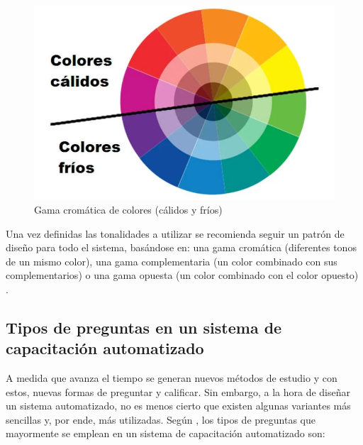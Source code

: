\begin{figure}[h]
\centering
 \includegraphics[width=0.6\linewidth]{imagen/gama.png}
 \caption{Gama cromática de colores (cálidos y fríos)}
 \label{fig:colores} 
\end{figure}

Una vez definidas las tonalidades a utilizar se recomienda seguir un patrón de diseño para todo el sistema, basándose en: una gama cromática (diferentes tonos de un mismo color), una gama complementaria (un color combinado con sus complementarios) o una gama opuesta (un color combinado con el color opuesto) \cite{TerronLopez2022}.

\subsection{Tipos de preguntas en un sistema de capacitación automatizado}
A medida que avanza el tiempo se generan nuevos métodos de estudio y con estos, nuevas formas de preguntar y calificar. Sin embargo, a la hora de diseñar un sistema automatizado, no es menos cierto que existen algunas variantes más sencillas y, por ende, más utilizadas. Según \cite{Laguna2016}, los tipos de preguntas que mayormente se emplean en un sistema de capacitación automatizado son:

